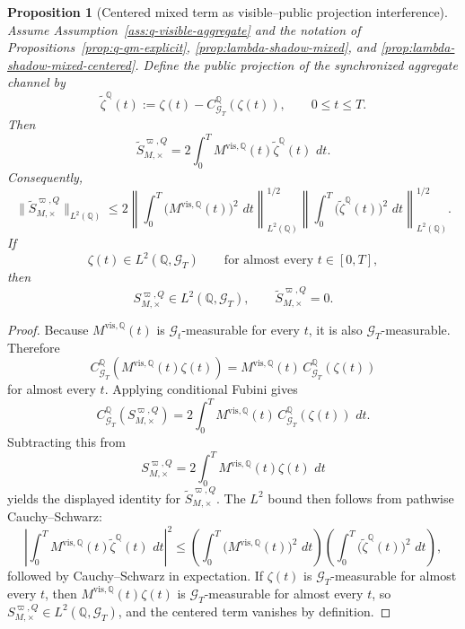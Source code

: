 \documentclass[11pt,a4paper]{amsart}
\theoremstyle{plain}
\newtheorem{proposition}[theorem]{Proposition}
\theoremstyle{definition}
\theoremstyle{remark}
\newcommand{\QQ}{\mathbb{Q}}
\newcommand{\cG}{\mathcal{G}}
\newcommand{\dd}{\,d}
\begin{document}
\begin{proposition}[Centered mixed term as visible--public projection interference]\label{prop:lambda-shadow-cross-public}
Assume Assumption~\ref{ass:q-visible-aggregate} and the notation of
Propositions~\ref{prop:q-qm-explicit}, \ref{prop:lambda-shadow-mixed}, and
\ref{prop:lambda-shadow-mixed-centered}.  Define the public projection of the synchronized aggregate
channel by
\[
        \widetilde\zeta^\QQ(t)
        :=
        \zeta(t)-C_{\cG_T}^\QQ(\zeta(t)),
        \qquad
        0\le t\le T.
\]
Then
\[
        \widetilde S_{M,\times}^{\varpi,Q}
        =
        2\int_0^T M^{\mathrm{vis},\QQ}(t)\widetilde\zeta^\QQ(t)\,\dd t.
\]
Consequently,
\[
        \|\widetilde S_{M,\times}^{\varpi,Q}\|_{L^2(\QQ)}
        \le
        2
        \left\|
                \int_0^T \bigl(M^{\mathrm{vis},\QQ}(t)\bigr)^2\,\dd t
        \right\|_{L^2(\QQ)}^{1/2}
        \left\|
                \int_0^T \bigl(\widetilde\zeta^\QQ(t)\bigr)^2\,\dd t
        \right\|_{L^2(\QQ)}^{1/2}.
\]
If
\[
        \zeta(t)\in L^2(\QQ,\cG_T)
        \qquad
        \text{for almost every }t\in[0,T],
\]
then
\[
        S_{M,\times}^{\varpi,Q}\in L^2(\QQ,\cG_T),
        \qquad
        \widetilde S_{M,\times}^{\varpi,Q}=0.
\]
\end{proposition}

\begin{proof}
Because \(M^{\mathrm{vis},\QQ}(t)\) is \(\cG_t\)-measurable for every \(t\), it is also
\(\cG_T\)-measurable.  Therefore
\[
        C_{\cG_T}^\QQ\!\left(
                M^{\mathrm{vis},\QQ}(t)\zeta(t)
        \right)
        =
        M^{\mathrm{vis},\QQ}(t)\,C_{\cG_T}^\QQ(\zeta(t))
\]
for almost every \(t\).  Applying conditional Fubini gives
\[
        C_{\cG_T}^\QQ\!\left(
                S_{M,\times}^{\varpi,Q}
        \right)
        =
        2\int_0^T
                M^{\mathrm{vis},\QQ}(t)\,
                C_{\cG_T}^\QQ(\zeta(t))\,\dd t.
\]
Subtracting this from
\[
        S_{M,\times}^{\varpi,Q}
        =
        2\int_0^T M^{\mathrm{vis},\QQ}(t)\zeta(t)\,\dd t
\]
yields the displayed identity for \(\widetilde S_{M,\times}^{\varpi,Q}\).  The \(L^2\) bound
then follows from pathwise Cauchy--Schwarz:
\[
        \left|
                \int_0^T M^{\mathrm{vis},\QQ}(t)\widetilde\zeta^\QQ(t)\,\dd t
        \right|^2
        \le
        \left(
                \int_0^T \bigl(M^{\mathrm{vis},\QQ}(t)\bigr)^2\,\dd t
        \right)
        \left(
                \int_0^T \bigl(\widetilde\zeta^\QQ(t)\bigr)^2\,\dd t
        \right),
\]
followed by Cauchy--Schwarz in expectation.  If \(\zeta(t)\) is \(\cG_T\)-measurable for almost
every \(t\), then \(M^{\mathrm{vis},\QQ}(t)\zeta(t)\) is \(\cG_T\)-measurable for almost every
\(t\), so \(S_{M,\times}^{\varpi,Q}\in L^2(\QQ,\cG_T)\), and the centered term vanishes by
definition.
\end{proof}
\end{document}
